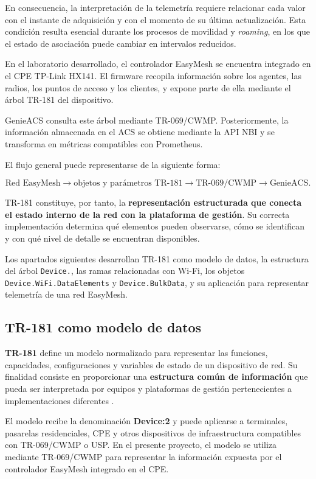 En consecuencia, la interpretación de la telemetría requiere relacionar
cada valor con el instante de adquisición y con el momento de su última
actualización. Esta condición resulta esencial durante los procesos de
movilidad y \textit{roaming}, en los que el estado de asociación puede
cambiar en intervalos reducidos.

En el laboratorio desarrollado, el controlador EasyMesh se encuentra
integrado en el CPE TP-Link HX141. El firmware recopila información sobre
los agentes, las radios, los puntos de acceso y los clientes, y expone
parte de ella mediante el árbol TR-181 del dispositivo.

GenieACS consulta este árbol mediante TR-069/CWMP. Posteriormente, la
información almacenada en el ACS se obtiene mediante la API NBI y se
transforma en métricas compatibles con Prometheus.

El flujo general puede representarse de la siguiente forma:

\[
    \text{Red EasyMesh}
    \longrightarrow
    \text{objetos y parámetros TR-181}
    \longrightarrow
    \text{TR-069/CWMP}
    \longrightarrow
    \text{GenieACS}.
\]

TR-181 constituye, por tanto, la
\textbf{representación estructurada que conecta el estado interno de la
red con la plataforma de gestión}. Su correcta implementación determina
qué elementos pueden observarse, cómo se identifican y con qué nivel de
detalle se encuentran disponibles.

Los apartados siguientes desarrollan TR-181 como modelo de datos, la
estructura del árbol \texttt{Device.}, las ramas relacionadas con Wi-Fi,
los objetos \texttt{Device.WiFi.DataElements} y
\texttt{Device.BulkData}, y su aplicación para representar telemetría de
una red EasyMesh.

\subsection{TR-181 como modelo de datos}
\label{subsec:tr181-modelo-datos}

\textbf{TR-181} define un modelo normalizado para representar las
funciones, capacidades, configuraciones y variables de estado de un
dispositivo de red. Su finalidad consiste en proporcionar una
\textbf{estructura común de información} que pueda ser interpretada por
equipos y plataformas de gestión pertenecientes a implementaciones
diferentes \cite{bbf_tr181}.

El modelo recibe la denominación \textbf{Device:2} y puede aplicarse a
terminales, pasarelas residenciales, CPE y otros dispositivos de
infraestructura compatibles con TR-069/CWMP o USP. En el presente
proyecto, el modelo se utiliza mediante TR-069/CWMP para representar la
información expuesta por el controlador EasyMesh integrado en el CPE.


